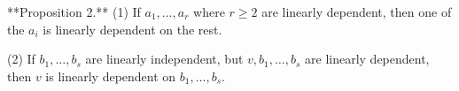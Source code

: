 **Proposition 2.** (1) If $a_1, \ldots, a_r$ where $r \geq 2$ are linearly dependent, then one of the $a_i$ is linearly dependent on the rest.

(2) If $b_1, \ldots, b_s$ are linearly independent, but $v, b_1, \ldots, b_s$ are linearly dependent, then $v$ is linearly dependent on $b_1, \ldots, b_s$.
